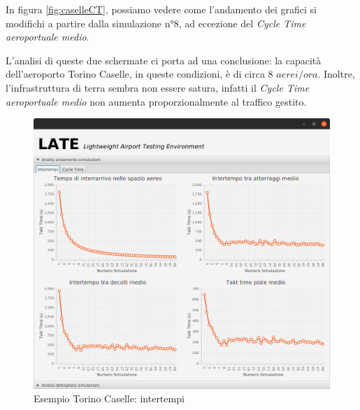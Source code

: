 \documentclass[a4paper, 12pt]{article}
\begin{document}
In figura \ref{fig:caselleCT}, possiamo vedere come l'andamento dei grafici si modifichi a partire dalla simulazione n°8, ad eccezione del \textit{Cycle Time aeroportuale medio}.


L'analisi di queste due schermate ci porta ad una conclusione: la capacità dell'aeroporto Torino Caselle, in queste condizioni, è di circa 8 $aerei/ora$. Inoltre, l'infrastruttura di terra sembra non essere satura, infatti il \textit{Cycle Time aeroportuale medio} non aumenta proporzionalmente al traffico gestito.

\begin{figure}[H]
\caption{Esempio Torino Caselle: intertempi}
 \label{fig:caselleIntertempi}
\hfill \includegraphics[height=0.44\textheight]{resources/images/Risultati_01.png}\hspace*{\fill}
\end{figure}
\end{document}
